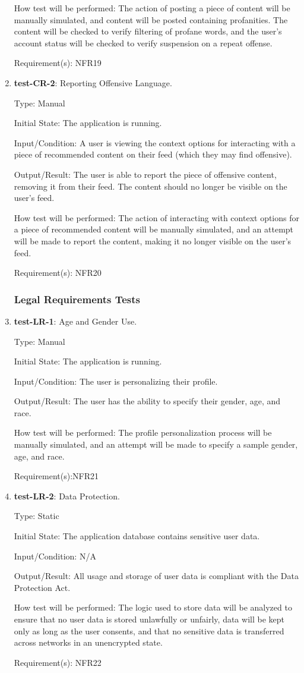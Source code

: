 \documentclass[12pt, titlepage]{article}
\begin{document}
\begin{enumerate}
		How test will be performed: The action of posting a piece of content will be manually simulated, and content will be posted containing profanities. The content will be checked to verify filtering of profane words, and the user's account status will be checked to verify suspension on a repeat offense.
		
		Requirement(s): NFR19
		
		\item{\textbf{test-CR-2}}: Reporting Offensive Language.
		
		Type: Manual
		
		Initial State: The application is running.
		
		Input/Condition: A user is viewing the context options for interacting with a piece of recommended content on their feed (which they may find offensive).
		
		Output/Result: The user is able to report the piece of offensive content, removing it from their feed. The content should no longer be visible on the user's feed.
		
		How test will be performed: The action of interacting with context options for a piece of recommended content will be manually simulated, and an attempt will be made to report the content, making it no longer visible on the user's feed.
		
		Requirement(s): NFR20
		
	\subsubsection{Legal Requirements Tests}
		\item{\textbf{test-LR-1}}: Age and Gender Use.
		
		Type: Manual
		
		Initial State: The application is running.
		
		Input/Condition: The user is personalizing their profile.
		
		Output/Result: The user has the ability to specify their gender, age, and race.
		
		How test will be performed: The profile personalization process will be manually simulated, and an attempt will be made to specify a sample gender, age, and race.
		
		Requirement(s):NFR21
		\item{\textbf{test-LR-2}}: Data Protection.
		
		Type: Static
		
		Initial State: The application database contains sensitive user data.
		
		Input/Condition: N/A
		
		Output/Result: All usage and storage of user data is compliant with the Data Protection Act.
		
		How test will be performed: The logic used to store data will be analyzed to ensure that no user data is stored unlawfully or unfairly, data will be kept only as long as the user consents, and that no sensitive data is transferred across networks in an unencrypted state.
		
		Requirement(s): NFR22
	\end{enumerate}
\end{document}
